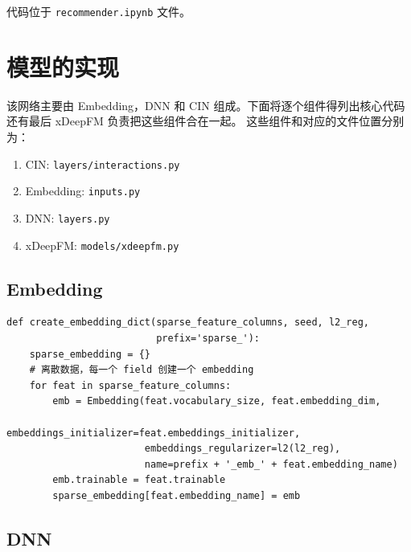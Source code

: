 \documentclass[degree=project,degree-type=project,cjk-font=noto]{thuthesis}
\begin{document}
代码位于 \texttt{recommender.ipynb} 文件。

\section{模型的实现}

该网络主要由 Embedding，DNN 和 CIN 组成。下面将逐个组件得列出核心代码
还有最后 xDeepFM 负责把这些组件合在一起。
这些组件和对应的文件位置分别为：

\begin{enumerate}
  \item CIN: \texttt{layers/interactions.py}
  \item Embedding: \texttt{inputs.py}
  \item DNN: \texttt{layers.py}
  \item xDeepFM: \texttt{models/xdeepfm.py}
\end{enumerate}

\subsection{Embedding}

  \begin{verbatim}
def create_embedding_dict(sparse_feature_columns, seed, l2_reg,
                          prefix='sparse_'):
    sparse_embedding = {}
    # 离散数据，每一个 field 创建一个 embedding
    for feat in sparse_feature_columns:
        emb = Embedding(feat.vocabulary_size, feat.embedding_dim,
                        embeddings_initializer=feat.embeddings_initializer,
                        embeddings_regularizer=l2(l2_reg),
                        name=prefix + '_emb_' + feat.embedding_name)
        emb.trainable = feat.trainable
        sparse_embedding[feat.embedding_name] = emb
  \end{verbatim}

\subsection{DNN}
\end{document}
